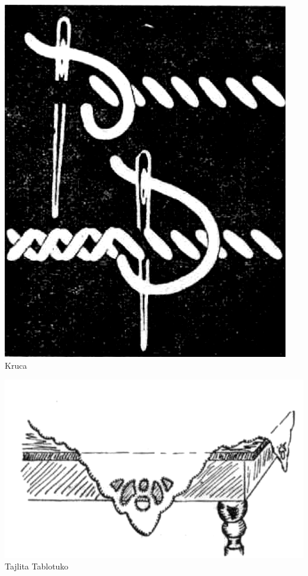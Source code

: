 \begin{center}\includegraphics[keepaspectratio,width=\textwidth,height=0.75\textheight]{11.png}\\
Kruca\end{center}

\begin{center}\includegraphics[keepaspectratio,width=\textwidth,height=0.75\textheight]{12.png}\\
Tajlita Tablotuko\end{center}

